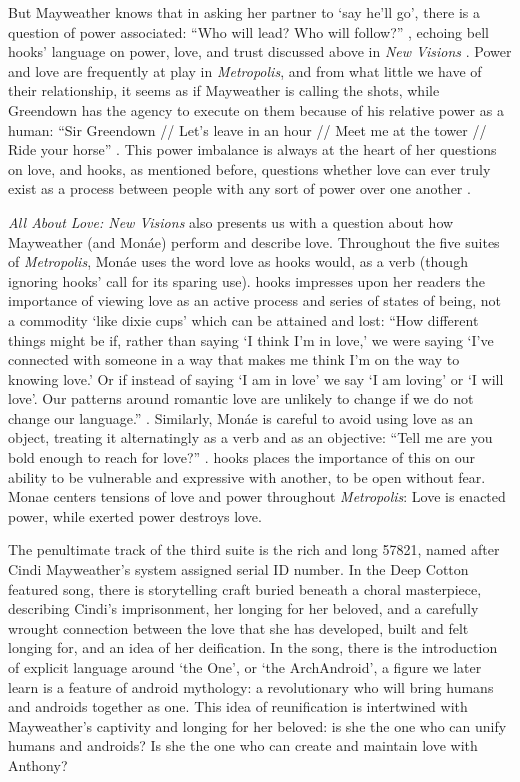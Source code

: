 \documentclass[a4paper, 11pt]{article} %
\begin{document}
But Mayweather knows that in asking her partner to `say he'll go', there is a question of power associated: ``Who will lead? Who will follow?''
 \cite{sayyouwillgo}, echoing bell hooks' language on power, love, and trust discussed above in \emph{New Visions} \cite{newvisions}.
Power and love are frequently at play in \emph{Metropolis}, and from what little we have of their relationship, it seems as if Mayweather is calling the shots, while Greendown has the agency to execute on them because of his relative power as a human: ``Sir Greendown // Let's leave in an hour // Meet me at the tower // Ride your horse'' \cite{greendown}.
This power imbalance is always at the heart of her questions on love, and hooks, as mentioned before, questions whether love can ever truly exist as a process between people with any sort of power over one another \cite{newvisions}.

\emph{All About Love: New Visions} also presents us with a question about how Mayweather (and Mon\'ae) perform and describe love.
Throughout the five suites of \emph{Metropolis}, Mon\'ae uses the word love as hooks would, as a verb (though ignoring hooks' call for its sparing use).
hooks impresses upon her readers the importance of viewing love as an active process and series of states of being, not a commodity `like dixie cups' which can be attained and lost:
``How different things might be if, rather than saying `I think I'm in love,' we were saying `I've connected with someone in a way that makes me think I'm on the way to knowing love.' Or if instead of saying `I am in love' we say `I am loving' or `I will love'. Our patterns around romantic love are unlikely to change if we do not change our language.'' \cite{newvisions}.
Similarly, Mon\'ae is careful to avoid using love as an object, treating it alternatingly as a verb and as an objective: ``Tell me are you bold enough to reach for love?'' \cite{manymoons}.
hooks places the importance of this on our ability to be vulnerable and expressive with another, to be open without fear.
Monae centers tensions of love and power throughout \emph{Metropolis}: Love is enacted power, while exerted power destroys love.

The penultimate track of the third suite is the rich and long 57821, named after Cindi Mayweather's system assigned serial ID number.
In the Deep Cotton featured song, there is storytelling craft buried beneath a choral masterpiece, describing Cindi's imprisonment, her longing for her beloved, and a carefully wrought connection between the love that she has developed, built and felt longing for, and an idea of her deification.
In the song, there is the introduction of explicit language around `the One', or `the ArchAndroid', a figure we later learn is a feature of android mythology: a revolutionary who will bring humans and androids together as one.
This idea of reunification is intertwined with Mayweather's captivity and longing for her beloved: is she the one who can unify humans and androids? Is she the one who can create and maintain love with Anthony?
\end{document}
